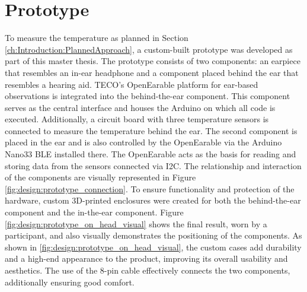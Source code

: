 \section{Prototype}
\label{ch:Design:Prototype}
To measure the temperature as planned in Section \ref{ch:Introduction:PlannedApproach}, a custom-built prototype was developed as part of this master thesis.
The prototype consists of two components: an earpiece that resembles an in-ear headphone and a component placed behind the ear that resembles a hearing aid. TECO's OpenEarable platform for ear-based observations is integrated into the behind-the-ear component. This component serves as the central interface and houses the Arduino on which all code is executed. Additionally, a circuit board with three temperature sensors is connected to measure the temperature behind the ear.
The second component is placed in the ear and is also controlled by the OpenEarable via the Arduino Nano33 BLE installed there. The OpenEarable acts as the basis for reading and storing data from the sensors connected via I2C. The relationship and interaction of the components are visually represented in Figure \ref{fig:design:prototype_connection}.
To ensure functionality and protection of the hardware, custom 3D-printed enclosures were created for both the behind-the-ear component and the in-the-ear component. 
Figure \ref{fig:design:prototype_on_head_visual} shows the final result, worn by a participant, and also visually demonstrates the positioning of the components.
As shown in \ref{fig:design:prototype_on_head_visual}, the custom cases add durability and a high-end appearance to the product, improving its overall usability and aesthetics.
The use of the 8-pin cable effectively connects the two components, additionally ensuring good comfort.

